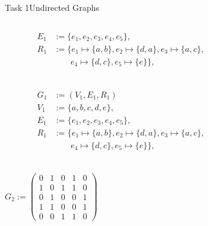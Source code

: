 \begin{frame}[allowframebreaks]{Task 1}{Undirected Graphs}
\begin{solutionnoinc}
\begin{columns}
\begin{column}{0.6\textwidth}
\begin{align*}
          E_1 &:= \{e_1, e_2, e_3, e_4, e_5\},\\
          R_1 &:= \{e_1 \mapsto \{a, b\} , e_2 \mapsto \{d, a\}, e_3 \mapsto \{a, c\},\\\ & \qquad e_4 \mapsto \{d, c\}, e_5 \mapsto \{e\}\},\\
        \end{align*}
      \end{column}
      \begin{column}{0.4\textwidth}
      \end{column}
    \end{columns}
  \end{solutionnoinc}
  \begin{solutionnoinc}
    \begin{columns}
      \begin{column}{0.6\textwidth}
        \centering
        \begin{align*}
          G_1 &:= (V_1, E_1, R_1)\\
          V_1 &:= \{a, b, c, d, e\},\\
          E_1 &:= \{e_1, e_2, e_3, e_4, e_5\},\\
          R_1 &:= \{e_1 \mapsto \{a, b\} , e_2 \mapsto \{d, a\}, e_3 \mapsto \{a, c\},\\\ & \qquad e_4 \mapsto \{d, c\}, e_5 \mapsto \{e\}\},\\
        \end{align*}
      \end{column}
      \begin{column}{0.4\textwidth}
      \end{column}
    \end{columns}
  \end{solutionnoinc}
  \begin{solutionnoinc}
    \begin{columns}
      \begin{column}{0.5\textwidth}
        \centering
        $G_2 :=
        \begin{pmatrix}
        0 & 1 & 0 & 1 & 0 \\
        1 & 0 & 1 & 1 & 0 \\
        0 & 1 & 0 & 0 & 1 \\
        1 & 1 & 0 & 0 & 1 \\
        0 & 0 & 1 & 1 & 0
        \end{pmatrix}$
      \end{column}

\end{columns}
\end{solutionnoinc}
\end{frame}
